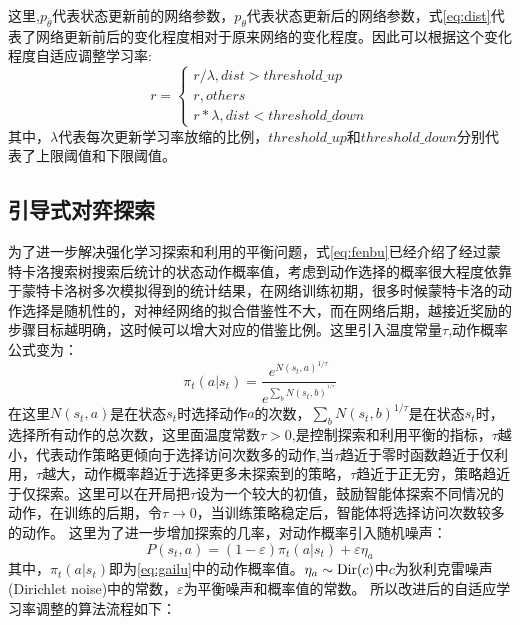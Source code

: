这里,$p_{\bar \theta}$代表状态更新前的网络参数，$p_\theta $代表状态更新后的网络参数，式\ref{eq:dist}代表了网络更新前后的变化程度相对于原来网络的变化程度。因此可以根据这个变化程度自适应调整学习率:
\begin{equation}
\label{eq:r}
r = \left\{ {\begin{array}{*{20}{c}}
	{r/\lambda ,dist > threshold\_up}\\
	{r,others}\\
	{r*\lambda ,dist < threshold\_down}
	\end{array}} \right.
\end{equation}
其中，$\lambda$代表每次更新学习率放缩的比例，$threshold\_up$和$threshold\_down$分别代表了上限阈值和下限阈值。
\subsection{引导式对弈探索}
为了进一步解决强化学习探索和利用的平衡问题，式\ref{eq:fenbu}已经介绍了经过蒙特卡洛搜索树搜索后统计的状态动作概率值，考虑到动作选择的概率很大程度依靠于蒙特卡洛树多次模拟得到的统计结果，在网络训练初期，很多时候蒙特卡洛的动作选择是随机性的，对神经网络的拟合借鉴性不大，而在网络后期，越接近奖励的步骤目标越明确，这时候可以增大对应的借鉴比例。这里引入温度常量$\tau $,动作概率公式变为：
\begin{equation}
\label{eq:gailu}
{\pi _t}(a|{s_t}) = \frac{{{e^{N{{({s_t},a)}^{1/\tau }}}}}}{{{e^{\sum\nolimits_b {N{{({s_t},b)}^{^{1/\tau }}}} }}}}
\end{equation}
在这里${N({s_t},a)}$是在状态$s_t$时选择动作$a$的次数，${\sum\nolimits_b {N{{({s_t},b)}^{1/\tau }}} }$是在状态$s_t$时，选择所有动作的总次数，这里面温度常数$\tau>0$,是控制探索和利用平衡的指标，$\tau$越小，代表动作策略更倾向于选择访问次数多的动作,当$\tau$趋近于零时函数趋近于仅利用，$\tau$越大，动作概率趋近于选择更多未探索到的策略，$\tau$趋近于正无穷，策略趋近于仅探索。这里可以在开局把$\tau$设为一个较大的初值，鼓励智能体探索不同情况的动作，在训练的后期，令$\tau  \to 0$，当训练策略稳定后，智能体将选择访问次数较多的动作。
这里为了进一步增加探索的几率，对动作概率引入随机噪声：
\begin{equation}
\label{eq:zaosheng}
	P({s_t},a) = (1 - \varepsilon ){\pi _t}(a|{s_t}) + \varepsilon {\eta _a}
\end{equation}
其中，${\pi _t}(a|{s_t})$即为\ref{eq:gailu}中的动作概率值。${\eta _a} \sim {\rm{Dir}}(c)$中$c$为狄利克雷噪声(Dirichlet noise)中的常数，$\varepsilon$为平衡噪声和概率值的常数。
所以改进后的自适应学习率调整的算法流程如下：
